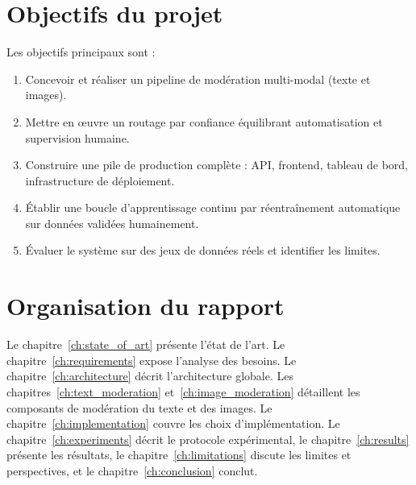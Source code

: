 \section{Objectifs du projet}

Les objectifs principaux sont :

\begin{enumerate}[nosep]
  \item Concevoir et réaliser un pipeline de modération multi-modal (texte et images).
  \item Mettre en \oe uvre un routage par confiance équilibrant automatisation et supervision humaine.
  \item Construire une pile de production complète : API, frontend, tableau de bord, infrastructure de déploiement.
  \item Établir une boucle d'apprentissage continu par réentraînement automatique sur données validées humainement.
  \item Évaluer le système sur des jeux de données réels et identifier les limites.
\end{enumerate}

\section{Organisation du rapport}

Le chapitre~\ref{ch:state_of_art} présente l'état de l'art. Le chapitre~\ref{ch:requirements} expose l'analyse des besoins. Le chapitre~\ref{ch:architecture} décrit l'architecture globale. Les chapitres~\ref{ch:text_moderation} et~\ref{ch:image_moderation} détaillent les composants de modération du texte et des images. Le chapitre~\ref{ch:implementation} couvre les choix d'implémentation. Le chapitre~\ref{ch:experiments} décrit le protocole expérimental, le chapitre~\ref{ch:results} présente les résultats, le chapitre~\ref{ch:limitations} discute les limites et perspectives, et le chapitre~\ref{ch:conclusion} conclut.
